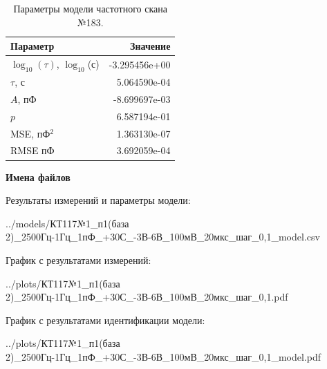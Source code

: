\begin{table}[!ht]
    \centering
    \caption{Параметры модели частотного скана №183.}
    \begin{tabular}{|l|r|}
        \hline
        Параметр                                       & Значение                  \\ \hline
        $\log_{10}(\tau)$, $\log_{10}$(с)              & -3.295456e+00             \\ \hline
        $\tau$, с                                      & 5.064590e-04              \\ \hline
        $A$, пФ                                        & -8.699697e-03             \\ \hline
        $p$                                            & 6.587194e-01              \\ \hline
        MSE, пФ$^2$                                    & 1.363130e-07              \\ \hline
        RMSE пФ                                        & 3.692059e-04              \\ \hline
    \end{tabular}
    \label{table:frequency_scan_model_183}
\end{table}

\textbf{Имена файлов}

Результаты измерений и параметры модели:

\scriptsize../models/КТ117№1\_п1(база 2)\_2500Гц-1Гц\_1пФ\_+30С\_-3В-6В\_100мВ\_20мкс\_шаг\_0,1\_model.csv
\normalsize

График с результатами измерений:

\scriptsize../plots/КТ117№1\_п1(база 2)\_2500Гц-1Гц\_1пФ\_+30С\_-3В-6В\_100мВ\_20мкс\_шаг\_0,1.pdf
\normalsize

График с результатами идентификации модели:

\scriptsize../plots/КТ117№1\_п1(база 2)\_2500Гц-1Гц\_1пФ\_+30С\_-3В-6В\_100мВ\_20мкс\_шаг\_0,1\_model.pdf
\normalsize

